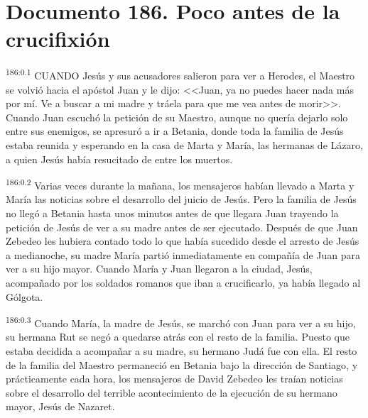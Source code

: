 \chapter{Documento 186. Poco antes de la crucifixión}
\par 
\textsuperscript{186:0.1} CUANDO Jesús y sus acusadores salieron para ver a Herodes, el Maestro se volvió hacia el apóstol Juan y le dijo: <<Juan, ya no puedes hacer nada más por mí. Ve a buscar a mi madre y tráela para que me vea antes de morir>>. Cuando Juan escuchó la petición de su Maestro, aunque no quería dejarlo solo entre sus enemigos, se apresuró a ir a Betania, donde toda la familia de Jesús estaba reunida y esperando en la casa de Marta y María, las hermanas de Lázaro, a quien Jesús había resucitado de entre los muertos.

\par 
\textsuperscript{186:0.2} Varias veces durante la mañana, los mensajeros habían llevado a Marta y María las noticias sobre el desarrollo del juicio de Jesús. Pero la familia de Jesús no llegó a Betania hasta unos minutos antes de que llegara Juan trayendo la petición de Jesús de ver a su madre antes de ser ejecutado. Después de que Juan Zebedeo les hubiera contado todo lo que había sucedido desde el arresto de Jesús a medianoche, su madre María partió inmediatamente en compañía de Juan para ver a su hijo mayor. Cuando María y Juan llegaron a la ciudad, Jesús, acompañado por los soldados romanos que iban a crucificarlo, ya había llegado al Gólgota.

\par 
\textsuperscript{186:0.3} Cuando María, la madre de Jesús, se marchó con Juan para ver a su hijo, su hermana Rut se negó a quedarse atrás con el resto de la familia. Puesto que estaba decidida a acompañar a su madre, su hermano Judá fue con ella. El resto de la familia del Maestro permaneció en Betania bajo la dirección de Santiago, y prácticamente cada hora, los mensajeros de David Zebedeo les traían noticias sobre el desarrollo del terrible acontecimiento de la ejecución de su hermano mayor, Jesús de Nazaret.


